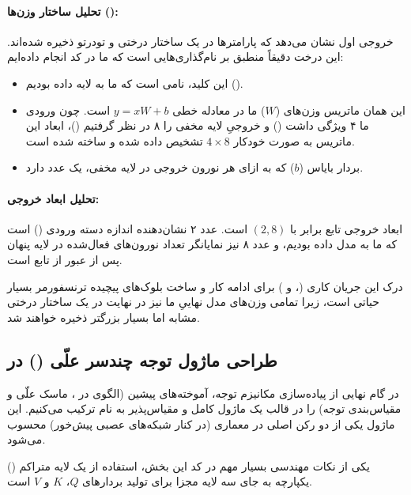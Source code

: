 \documentclass{article}
\begin{document}
\paragraph{تحلیل ساختار وزن‌ها ():}
خروجی اول نشان می‌دهد که پارامترها در یک ساختار درختی و تودرتو ذخیره شده‌اند. این درخت دقیقاً منطبق بر نام‌گذاری‌هایی است که ما در کد انجام داده‌ایم:
\begin{itemize}
	\item {} این کلید، نامی است که ما به لایه  داده بودیم ().
	\item {} این همان ماتریس وزن‌های ($W$) ما در معادله خطی $y = xW + b$ است. چون ورودی ما ۴ ویژگی داشت () و خروجیِ لایه مخفی را ۸ در نظر گرفتیم ()، ابعاد این ماتریس به صورت خودکار $4 \times 8$ تشخیص داده شده و ساخته شده است.
	\item {} بردار بایاس ($b$) که به ازای هر نورون خروجی در لایه مخفی، یک عدد دارد.
\end{itemize}

\paragraph{تحلیل ابعاد خروجی:}
ابعاد خروجی تابع  برابر با $(2, 8)$ است. عدد ۲ نشان‌دهنده اندازه دسته ورودی () است که ما به مدل داده بودیم، و عدد ۸ نیز نمایانگر تعداد نورون‌های فعال‌شده در لایه پنهان پس از عبور از تابع  است. 

درک این جریان کاری (،  و ) برای ادامه کار و ساخت بلوک‌های پیچیده ترنسفورمر بسیار حیاتی است، زیرا تمامی وزن‌های مدل نهاییِ  ما نیز در نهایت در یک ساختار درختی مشابه اما بسیار بزرگتر ذخیره خواهند شد.

\subsection{طراحی ماژول توجه چندسر علّی () در }

در گام نهایی از پیاده‌سازی مکانیزم توجه، آموخته‌های پیشین (الگوی  در ، ماسک علّی و مقیاس‌بندی توجه) را در قالب یک ماژول کامل و مقیاس‌پذیر به نام  ترکیب می‌کنیم. این ماژول یکی از دو رکن اصلی در معماری  (در کنار شبکه‌های عصبی پیش‌خور) محسوب می‌شود.

یکی از نکات مهندسی بسیار مهم در کد این بخش، استفاده از یک لایه متراکم () یکپارچه به جای سه لایه مجزا برای تولید بردارهای $Q$، $K$ و $V$ است.
\end{document}
